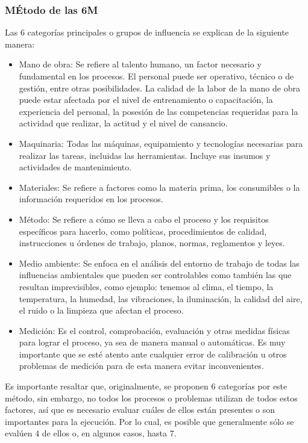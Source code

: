 \documentclass[../main]{subfiles}
\begin{document}
\subsubsection{MÉtodo de las 6M}
Las 6 categorías principales o grupos de influencia se explican de la
siguiente manera:
\begin{itemize}
  \item Mano de obra: Se refiere al talento humano, un factor
    necesario y fundamental en los procesos. El personal puede ser
    operativo, técnico o de gestión, entre otras posibilidades. La
    calidad de la labor de la mano de obra puede estar afectada por el
    nivel de entrenamiento o capacitación, la experiencia del
    personal, la posesión de las competencias requeridas para la
    actividad que realizar, la actitud y el nivel de cansancio.

  \item Maquinaria: Todas las máquinas, equipamiento y tecnologías
    necesarias para realizar las tareas, incluidas las herramientas.
    Incluye sus insumos y actividades de mantenimiento.

  \item Materiales: Se refiere a factores como la materia prima, los
    consumibles o la información requeridos en los procesos.

  \item Método: Se refiere a cómo se lleva a cabo el proceso y los
    requisitos específicos para hacerlo, como políticas,
    procedimientos de calidad, instrucciones u órdenes de trabajo,
    planos, normas, reglamentos y leyes.

  \item Medio ambiente: Se enfoca en el análisis del entorno de
    trabajo de todas las influencias ambientales que pueden ser
    controlables como también las que resultan imprevisibles, como
    ejemplo: tenemos al clima, el tiempo, la temperatura, la humedad,
    las vibraciones, la iluminación, la calidad del aire, el ruido o
    la limpieza que afectan el proceso.

  \item Medición: Es el control, comprobación, evaluación y otras
    medidas físicas para lograr el proceso, ya sea de manera manual o
    automáticas. Es muy importante que se esté atento ante cualquier
    error de calibración u otros problemas de medición para de esta
    manera evitar inconvenientes.
\end{itemize}
Es importante resaltar que, originalmente, se proponen 6 categorías
por este método, sin embargo, no todos los procesos o problemas
utilizan de todos estos factores, así que es necesario evaluar cuáles
de ellos están presentes o son importantes para la ejecución. Por
lo cual, es posible que generalmente sólo se evalúen 4 de ellos o, en
 algunos casos, hasta 7.
\end{document}
